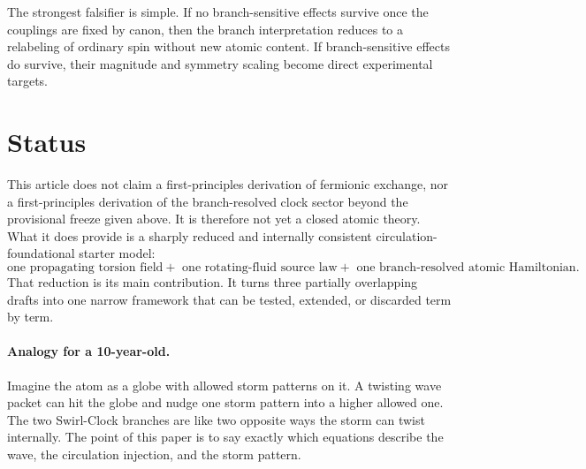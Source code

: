 \documentclass[11pt,a4paper]{article}
\begin{document}
The strongest falsifier is simple. If no branch-sensitive effects survive once the couplings are fixed by canon, then the branch interpretation reduces to a relabeling of ordinary spin without new atomic content. If branch-sensitive effects do survive, their magnitude and symmetry scaling become direct experimental targets.

\section{Status}
This article does not claim a first-principles derivation of fermionic exchange, nor a first-principles derivation of the branch-resolved clock sector beyond the provisional freeze given above. It is therefore not yet a closed atomic theory. What it does provide is a sharply reduced and internally consistent circulation-foundational starter model:
\begin{equation}
\boxed{
\text{one propagating torsion field}
+\text{ one rotating-fluid source law}
+\text{ one branch-resolved atomic Hamiltonian}.
}
\end{equation}
That reduction is its main contribution. It turns three partially overlapping drafts into one narrow framework that can be tested, extended, or discarded term by term.

\paragraph{Analogy for a 10-year-old.} Imagine the atom as a globe with allowed storm patterns on it. A twisting wave packet can hit the globe and nudge one storm pattern into a higher allowed one. The two Swirl-Clock branches are like two opposite ways the storm can twist internally. The point of this paper is to say exactly which equations describe the wave, the circulation injection, and the storm pattern.
\end{document}
